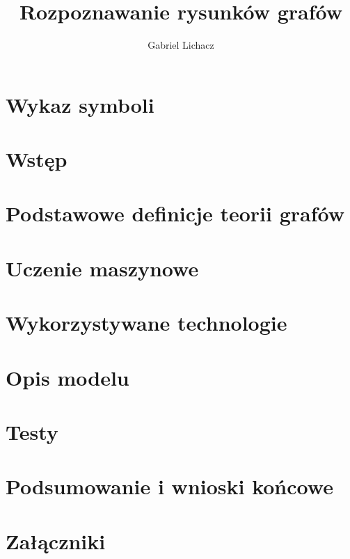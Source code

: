 \documentclass[12pt,twoside]{article}
\author{Gabriel Lichacz}
\title{Rozpoznawanie rysunków grafów}
\begin{document}
\maketitle

\blankpage

\tableofcontents

\clearpage
\blankpage

\section*{Wykaz symboli}

\clearpage

\section{Wstęp}


\section{Podstawowe definicje teorii grafów}


\section{Uczenie maszynowe}


\section{Wykorzystywane technologie}


\section{Opis modelu}


\section{Testy}


\section{Podsumowanie i wnioski końcowe}


\clearpage

\section*{Załączniki}


\clearpage



\clearpage


\end{document}
